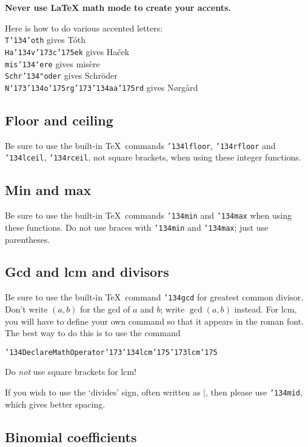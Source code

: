 \documentclass[12pt]{article}
\begin{document}
{\bf Never use LaTeX math mode to create your accents.}

Here is how to do various accented letters: \\
	{\tt T\char'134'oth} gives T\'oth \\
	{\tt Ha{\char'134}v{\char'173}c{\char'175}ek} gives Ha\v{c}ek \\
	{\tt mis\char'134`ere} gives mis\`ere \\
	{\tt Schr\char'134"oder} gives Schr\"oder \\
	{\tt N\char'173\char'134o\char'175rg\char'173\char'134aa\char'175rd} gives N{\o}rg{\aa}rd


\subsection{Floor and ceiling}

    Be sure to use the built-in \TeX\ commands
{\tt \char'134lfloor}, {\tt \char'134rfloor} and
{\tt \char'134lceil}, {\tt \char'134rceil}, not square brackets,
when using these integer functions.

\subsection{Min and max}

     Be sure to use the built-in \TeX\ commands
{\tt \char'134min} and {\tt \char'134max} when using these functions.
Do not use braces with {\tt \char'134min} and {\tt \char'134max};
just use parentheses.

\subsection{Gcd and lcm and divisors}

     Be sure to use the built-in \TeX\ command {\tt\char'134gcd}
for greatest common divisor.  Don't write $(a,b)$ for the gcd of $a$ and
$b$; write $\gcd(a,b)$ instead.  For lcm, you will have to define
your own command so that it appears in the roman font.  The best way
to do this is to use the command

{\tt \char'134DeclareMathOperator\char'173\char'134lcm\char'175\char'173lcm\char'175}

Do {\it not\/} use square brackets for lcm!

   If you wish to use the `divides' sign, often written as $|$,
then please use {\tt \char'134mid}, which gives better spacing.

\subsection{Binomial coefficients}
\end{document}
